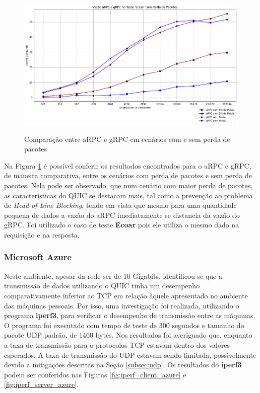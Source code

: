 \begin{figure}[!ht]
    \centering
    \caption{Comparação entre aRPC e gRPC em cenários com e sem perda de pacotes}
    \includegraphics[width=\textwidth]{figuras/transporte/arpc_grpc_lossy.png} 
    \label{fig:arpc_grpc_lossy}
\end{figure}

Na Figura \ref{fig:arpc_grpc_lossy} é possível conferir os resultados encontrados para o aRPC e gRPC, de maneira comparativa, entre os cenários com perda de pacotes e sem perda de pacotes. Nela pode ser observado, que num cenário com maior perda de pacotes, as características do QUIC se destacam mais, tal como a prevenção ao problema de \textit{Head-of-Line Blocking}, tendo em vista que mesmo para uma quantidade pequena de dados a vazão do aRPC imediatamente se distancia da vazão do gRPC. Foi utilizado o caso de teste \textbf{Ecoar} pois ele utiliza o mesmo dado na requisição e na resposta.

\subsubsection{Microsoft Azure}

Neste ambiente, apesar da rede ser de 10 Gigabits, identificou-se que a transmissão de dados utilizando o QUIC tinha um desempenho comparativamente inferior ao TCP em relação àquele apresentado no ambiente das máquinas pessoais. Por isso, uma investigação foi realizada, utilizando o programa \textbf{iperf3}, para verificar o desempenho de transmissão entre as máquinas. O programa foi executado com tempo de teste de 300 segundos e tamanho do pacote UDP padrão, de 1460 bytes. Nos resultados foi averiguado que, enquanto a taxa de transmissão para o protocolos TCP estavam dentro dos valores esperados. A taxa de transmissão do UDP estavam sendo limitada, possivelmente devido a mitigações descritas na Seção \ref{subsec:udp}. Os resultados do \textbf{iperf3} podem ser conferidos nas Figuras \ref{fig:iperf_client_azure} e \ref{fig:iperf_server_azure}.

